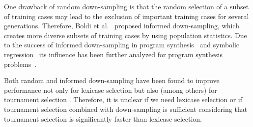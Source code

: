 One drawback of random down-sampling is that the random selection of a subset of training cases may lead to the exclusion of important training cases for several generations. Therefore, Boldi et al.~\cite{boldi2024informed} proposed informed down-sampling, which creates more diverse subsets of training cases by using population statistics. Due to the success of informed down-sampling in program synthesis~\cite{boldi2024informed} and symbolic regression~\cite{geiger2024lexicase} its influence has been further analyzed for program synthesis problems~\cite{boldi2024untangling, Boldi2023.static, boldi2023problem}.

Both random and informed down-sampling have been found to improve performance not only for lexicase selection but also (among others) for tournament selection \cite{geiger2024lexicase, boldi2024untangling}.
Therefore, it is unclear if we need lexicase selection or if tournament selection combined with down-sampling is sufficient considering that tournament selection is significantly faster than lexicase selection.